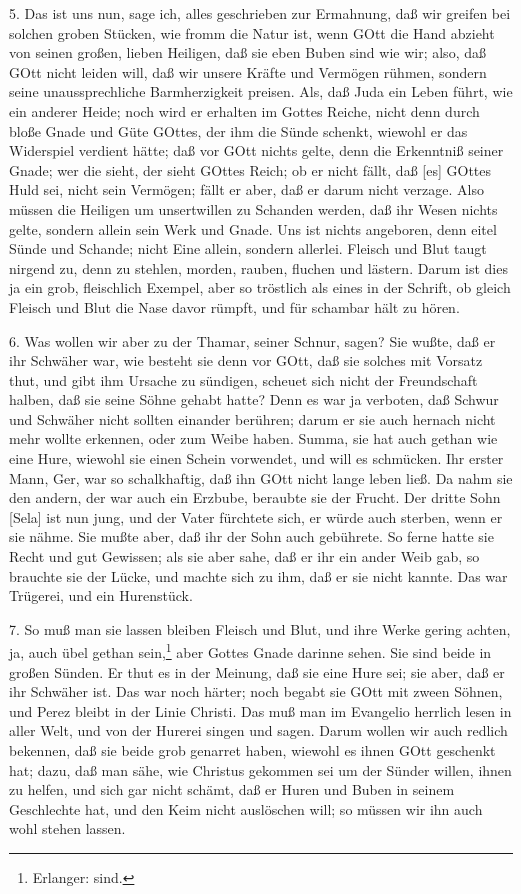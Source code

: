 5. Das ist uns nun, sage ich, alles geschrieben zur Ermahnung, daß wir greifen bei solchen groben Stücken, wie fromm die Natur ist, wenn GOtt die Hand abzieht von seinen großen, lieben Heiligen, daß sie eben Buben sind wie wir; also, daß GOtt nicht leiden will, daß wir unsere Kräfte und Vermögen rühmen, sondern seine unaussprechliche Barmherzigkeit preisen. Als, daß Juda ein Leben führt, wie ein anderer Heide; noch wird er erhalten im Gottes Reiche, nicht denn durch bloße Gnade und Güte GOttes, der ihm die Sünde schenkt, wiewohl er das Widerspiel verdient hätte; daß vor GOtt nichts gelte, denn die Erkenntniß seiner Gnade; wer die sieht, der sieht GOttes Reich; ob er nicht fällt, daß [es] GOttes Huld sei, nicht sein Vermögen; fällt er aber, daß er darum nicht verzage. Also müssen die Heiligen um unsertwillen zu Schanden werden, daß ihr Wesen nichts gelte, sondern allein sein Werk und Gnade. Uns ist nichts angeboren, denn eitel Sünde und Schande; nicht Eine allein, sondern allerlei. Fleisch und Blut taugt nirgend zu, denn zu stehlen, morden, rauben, fluchen und lästern. Darum ist dies ja ein grob, fleischlich Exempel, aber so tröstlich als eines in der Schrift, ob gleich Fleisch und Blut die Nase davor rümpft, und für schambar hält zu hören.

6. Was wollen wir aber zu der Thamar, seiner Schnur, sagen? Sie wußte, daß er ihr Schwäher war, wie besteht sie denn vor GOtt, daß sie solches mit Vorsatz thut, und gibt ihm
Ursache zu sündigen, scheuet sich nicht der Freundschaft halben, daß sie seine Söhne gehabt hatte? Denn es war ja verboten, daß Schwur und Schwäher nicht sollten einander berühren; darum er sie auch hernach nicht mehr wollte erkennen, oder zum Weibe haben. Summa, sie hat auch gethan wie eine Hure, wiewohl sie einen Schein vorwendet, und will es schmücken. Ihr erster Mann, Ger, war so schalkhaftig, daß ihn GOtt nicht lange leben ließ. Da nahm sie den andern, der war auch ein Erzbube, beraubte sie der Frucht. Der dritte Sohn [Sela] ist nun jung, und der Vater fürchtete sich, er würde auch sterben, wenn er sie nähme. Sie mußte aber, daß ihr der Sohn auch gebührete. So ferne hatte sie Recht und gut Gewissen; als sie aber sahe, daß er ihr ein ander Weib gab, so brauchte sie der Lücke, und machte sich zu ihm, daß er sie nicht kannte. Das war Trügerei, und ein Hurenstück.

7. So muß man sie lassen bleiben Fleisch und Blut, und ihre Werke gering achten, ja, auch übel gethan sein,\footnote{Erlanger: sind.} aber Gottes Gnade darinne sehen. Sie sind beide in großen Sünden. Er thut es in der Meinung, daß sie eine Hure sei; sie aber, daß er ihr Schwäher ist. Das war noch härter; noch begabt sie GOtt mit zween Söhnen, und Perez bleibt in der Linie Christi. Das muß man im Evangelio herrlich lesen in aller Welt, und von der Hurerei singen und sagen. Darum wollen wir auch redlich bekennen, daß sie beide grob genarret haben, wiewohl es ihnen GOtt geschenkt hat; dazu, daß man sähe, wie Christus gekommen sei um der Sünder willen, ihnen zu helfen, und sich gar nicht schämt, daß er Huren und Buben in seinem Geschlechte hat, und den Keim nicht auslöschen will; so müssen wir ihn auch wohl stehen lassen.

